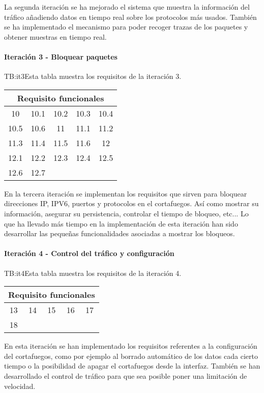 La segunda iteración se ha mejorado el sistema que muestra la información del tráfico añadiendo datos en tiempo real sobre los protocolos más usados. También se ha implementado el mecanismo para poder recoger trazas de los paquetes y obtener muestras en tiempo real.
\paragraph{Iteración 3 - Bloquear paquetes}
\begin{table}[Tabla de la iteración 3]{TB:it3}{Esta tabla muestra los requisitos de la iteración 3.}
  \begin{tabular}{ccccc}
  \multicolumn{5}{c}{\textbf{Requisito funcionales}} \\ \hline
    \hline
    10 & 10.1 & 10.2 & 10.3 & 10.4 \\
    10.5 & 10.6 & 11 & 11.1 & 11.2\\
    11.3 & 11.4 & 11.5 & 11.6 & 12\\
    12.1 & 12.2 & 12.3 & 12.4 & 12.5\\
    12.6 & 12.7\\
    \hline
  \end{tabular}
\end{table}
En la tercera iteración se implementan los requisitos que sirven para bloquear direcciones IP, IPV6, puertos y protocolos en el cortafuegos. Así como mostrar su información, asegurar su persistencia, controlar el tiempo de bloqueo, etc... Lo que ha llevado más tiempo en la implementación de esta iteración han sido desarrollar las pequeñas funcionalidades asociadas a mostrar los bloqueos.


\paragraph{Iteración 4 - Control del tráfico y configuración}
\begin{table}[Tabla de la iteración 4]{TB:it4}{Esta tabla muestra los requisitos de la iteración 4.}
  \begin{tabular}{ccccc}
  \multicolumn{5}{c}{\textbf{Requisito funcionales}} \\ \hline
    \hline
    13 & 14 & 15 & 16 & 17\\
    18 \\
    \hline
  \end{tabular}
\end{table}

En esta iteración se han implementado los requisitos referentes a la configuración del cortafuegos, como por ejemplo al borrado automático de los datos cada cierto tiempo o la posibilidad de apagar el cortafuegos desde la interfaz. También se han desarrollado el control de tráfico para que sea posible poner una limitación de velocidad.
